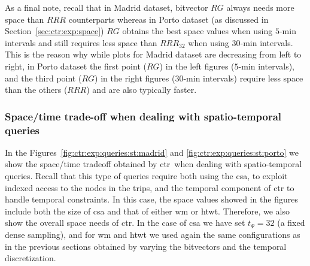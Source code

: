 

	As a final note, recall that in Madrid dataset, bitvector $RG$ always needs more space than $RRR$ counterparts 
	whereas in Porto dataset (as discussed in Section~\ref{sec:ctr:exp:space})
	$RG$ obtains the best space values when using $5$-min intervals and still requires less space than $RRR_{32}$ when using
	$30$-min intervals. 
	This is the reason why while plots for Madrid dataset are decreasing from left to right, in Porto
	dataset the first point ($RG$) in the left figures ($5$-min intervals), and the third point ($RG$) 
	in the right figures ($30$-min intervals) require less space than the others ($RRR$) and are also typically  faster. 


	\subsubsection{Space/time trade-off when dealing with spatio-temporal queries}
	\label{sec:ctr:exp:queries:st}

	In the Figures~\ref{fig:ctr:exp:queries:st:madrid} and \ref{fig:ctr:exp:queries:st:porto} we show the space/time tradeoff obtained by \gls{ctr}\ when 
	dealing with spatio-temporal queries. Recall that this type of queries require both using the \gls{csa}, to 
	exploit indexed access to the nodes in the trips, and the 
	temporal component of \gls{ctr} to handle temporal constraints. In this case, the space values showed in
	the figures include both the size of \gls{csa} and that of either \gls{wm} or \gls{htwt}. Therefore, we also show the
	overall space needs of \gls{ctr}. In the case of \gls{csa} we
	have set $t_{\Psi}=32$ (a fixed dense sampling), and for \gls{wm} and \gls{htwt} we used again the same configurations as in the previous sections obtained by varying the bitvectors and the temporal discretization. 

